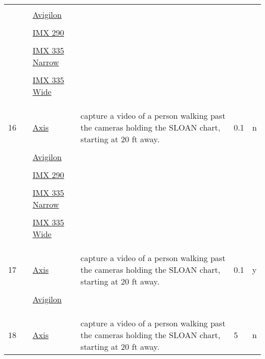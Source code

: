 \documentclass{article}%
\begin{document}
\begin{longtabu}{m{2.5cm} m{4cm} m{2cm} m{4cm} m{2cm} m{2cm}}
&&&&&\\%
&&\href{https://drive.google.com/file/d/1YXLg--dhQghqL3d_TlzZ0flOPOcy9o9Y/view?usp=sharing}{Avigilon}&&&\\%
&&&&&\\%
&&\href{}{IMX 290}&&&\\%
&&&&&\\%
&&\href{}{IMX 335 Narrow}&&&\\%
&&&&&\\%
&&\href{}{IMX 335 Wide}&&&\\%
&&&&&\\%
&&&&&\\%
\hline%
&&&&&\\%
16&&\href{https://drive.google.com/file/d/1SGPGBM5kewr4yCbzRcrTS8k3KuzkxLTE/view?usp=sharing}{Axis}&capture a video of a person walking past the cameras holding the SLOAN chart, starting at 20 ft away.&0.1&n\\%
&&&&&\\%
&&\href{https://drive.google.com/file/d/1sSFMN9RgH41Ack8QwPHl4toOK-yV0XCK/view?usp=sharing}{Avigilon}&&&\\%
&&&&&\\%
&&\href{https://drive.google.com/file/d/1_Dvqxgpe137cXFg3uEazDjb0ea0tQ2jb/view?usp=sharing}{IMX 290}&&&\\%
&&&&&\\%
&&\href{https://drive.google.com/file/d/1uF-_dqiH_tXvskZToknHZdxHpJjvsEgX/view?usp=sharing}{IMX 335 Narrow}&&&\\%
&&&&&\\%
&&\href{https://drive.google.com/file/d/1cMuoQb0DX44kbr-UMbuoYcuFh-sQO3az/view?usp=sharing}{IMX 335 Wide}&&&\\%
&&&&&\\%
&&&&&\\%
\hline%
&&&&&\\%
17&&\href{https://drive.google.com/file/d/1ysMhKLIEl8WZ-GuwNVj6OU-vUJPTcZy5/view?usp=sharing}{Axis}&capture a video of a person walking past the cameras holding the SLOAN chart, starting at 20 ft away.&0.1&y\\%
&&&&&\\%
&&\href{https://drive.google.com/file/d/1y16gl53QlUrYQUzVqQ83XF5BGqz7V7Fq/view?usp=sharing}{Avigilon}&&&\\%
&&&&&\\%
&&&&&\\%
\hline%
&&&&&\\%
18&&\href{https://drive.google.com/file/d/1M6a9LU_WlpOEVO1sdOCVRsjKHcKuhWdT/view?usp=sharing}{Axis}&capture a video of a person walking past the cameras holding the SLOAN chart, starting at 20 ft away.&5&n\\%

\end{longtabu}
\end{document}
